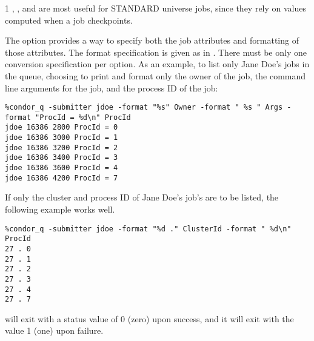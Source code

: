 \begin{ManPage}{\label{man-condor-q}}{1}
, , and  are most useful for STANDARD
universe jobs, since they rely on values computed when a job
checkpoints.

\Examples

The  option provides a way to specify both the job attributes
and formatting of those attributes.
The format specification is given as in .
There must be only one conversion specification per  option.
As an example, to list only Jane Doe's jobs in the queue,
choosing to print and format only the owner of the job,
the command line arguments for the job, and the
process ID of the job:
\begin{verbatim}
%condor_q -submitter jdoe -format "%s" Owner -format " %s " Args -format "ProcId = %d\n" ProcId
jdoe 16386 2800 ProcId = 0
jdoe 16386 3000 ProcId = 1
jdoe 16386 3200 ProcId = 2
jdoe 16386 3400 ProcId = 3
jdoe 16386 3600 ProcId = 4
jdoe 16386 4200 ProcId = 7
\end{verbatim}

If only the cluster and process ID of Jane Doe's job's are to
be listed, the following example works well.
\begin{verbatim}
%condor_q -submitter jdoe -format "%d ." ClusterId -format " %d\n" ProcId
27 . 0
27 . 1
27 . 2
27 . 3
27 . 4
27 . 7
\end{verbatim}

\ExitStatus

 will exit with a status value of 0 (zero) upon success,
and it will exit with the value 1 (one) upon failure.

\end{ManPage}
